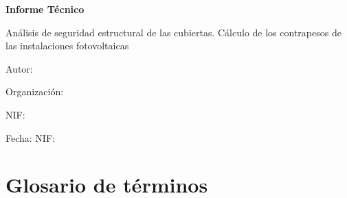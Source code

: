 \documentclass[a4paper,12pt]{article}
\let\OldTextField\TextField
\renewcommand{\TextField}[2][]{%
  \raisebox{-0.1ex}{\OldTextField[height=.95em,  bordercolor={1 1 1}, backgroundcolor={1 1 1},#1]{#2}}%
}
\begin{document}
\begin{Form}




\begin{titlepage}
    \centering
    {\scshape\LARGE  \par}
    \vspace{1cm}
    {\Huge\bfseries Informe Técnico\par}
    \vspace{2cm}
    {\Large Análisis de seguridad estructural de
    las cubiertas. Cálculo de los contrapesos de las
    instalaciones fotovoltaicas \par}
    \vspace{1cm}
    \vfill
    Autor: \TextField[name=Tecnico,width=6cm,default=Juan Pérez]{} \par
    Organización: \TextField[name=Organizacion,width=6cm,default=CalcAE]{} \par
    NIF: \TextField[name=NIF,width=6cm,default=12345678]{} \par
    Fecha:  NIF: \TextField[name=Fecha,width=6cm,default=\today]{} \par
\end{titlepage}

\begin{abstract}
  El texto del resumen debe estar de acuerdo con la Norma UNE 50103. En síntesis, debe ser tan informativo como lo
  permita la naturaleza del documento, para que los lectores puedan decidir si es necesario leer el documento completo;
  debe definir el objetivo, métodos, resultados y conclusiones presentadas en el documento original, bien en ese orden,
  o destacando inicialmente los resultados y conclusiones; debe constituir un texto completo, para que sea inteligible sin
  necesidad de referirse al documento. Debe ser conciso sin ser oscuro, reteniendo la información básica y el carácter
  del documento original. Los resúmenes de la mayoría de los informes deben tener menos de 250 palabras y en ningún
  caso más de 500; Deben estar escritos en un solo párrafo; emplear normalmente frases completas, verbos en forma
  activa y con tercera persona. No se deben utilizar figuras y símbolos, tales como tablas cortas y fórmulas, más que
  cuando no haya ninguna alternativa aceptable.\end{abstract}

\tableofcontents

\section*{Glosario de términos}


\end{Form}
\end{document}
